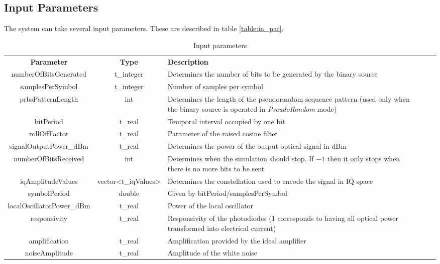 \subsection*{Input Parameters}

The system can take several input parameters. These are described in table \ref{table:in_par}.

\begin{table}[]
	\centering
	\caption{Input parameters}
	\begin{tabular}{|c|c|p{60mm}|ccp{60mm}}
		\cline{1-3}
		\textbf{Parameter} & \textbf{Type} & \textbf{Description} &    \\ \cline{1-3}
		numberOfBitsGenerated & t\_integer & Determines the number of bits to be generated by the binary source  &    \\ \cline{1-3}
		samplesPerSymbol & t\_integer & Number of samples per symbol &    \\ \cline{1-3}
		prbsPatternLength & int & Determines the length of the pseudorandom sequence pattern (used only when the binary source is operated in \textit{PseudoRandom} mode) &    \\ \cline{1-3}
		bitPeriod & t\_real & Temporal interval occupied by one bit &    \\ \cline{1-3}
		rollOffFactor & t\_real & Parameter of the raised cosine filter &    \\ \cline{1-3}
		signalOutputPower\_dBm & t\_real & Determines the power of the output optical signal in dBm &  \\ \cline{1-3}
		numberOfBitsReceived & int &   Determines when the simulation should stop. If $-1$ then it only stops when there is no more bits to be sent&   \\ \cline{1-3}
		iqAmplitudeValues & vector<t\_iqValues> & Determines the constellation used to encode the signal in IQ space &    \\ \cline{1-3}
		symbolPeriod & double & Given by bitPeriod/samplesPerSymbol &    \\ \cline{1-3}
		localOscillatorPower\_dBm & t\_real & Power of the local oscillator &    \\ \cline{1-3}
		responsivity & t\_real & Responsivity of the photodiodes (1 corresponds to having all optical power transformed into electrical current) &    \\ \cline{1-3}
		amplification & t\_real & Amplification provided by the ideal amplifier &    \\ \cline{1-3}
		noiseAmplitude & t\_real & Amplitude of the white noise &    \\ \cline{1-3}

\end{tabular}
\end{table}
